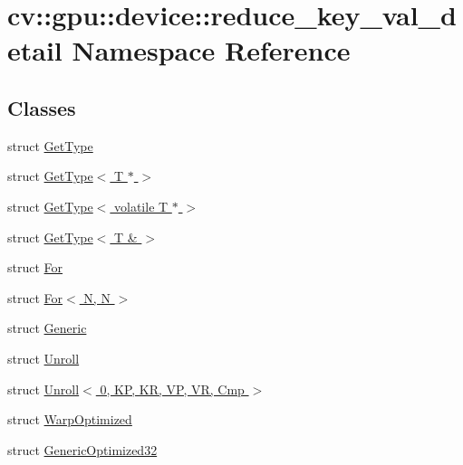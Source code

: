 \hypertarget{namespacecv_1_1gpu_1_1device_1_1reduce__key__val__detail}{\section{cv\-:\-:gpu\-:\-:device\-:\-:reduce\-\_\-key\-\_\-val\-\_\-detail Namespace Reference}
\label{namespacecv_1_1gpu_1_1device_1_1reduce__key__val__detail}
}
\subsection*{Classes}
\begin{DoxyCompactItemize}
\item 
struct \hyperlink{structcv_1_1gpu_1_1device_1_1reduce__key__val__detail_1_1GetType}{Get\-Type}
\item 
struct \hyperlink{structcv_1_1gpu_1_1device_1_1reduce__key__val__detail_1_1GetType_3_01T_01_5_01_4}{Get\-Type$<$ T $\ast$ $>$}
\item 
struct \hyperlink{structcv_1_1gpu_1_1device_1_1reduce__key__val__detail_1_1GetType_3_01volatile_01T_01_5_01_4}{Get\-Type$<$ volatile T $\ast$ $>$}
\item 
struct \hyperlink{structcv_1_1gpu_1_1device_1_1reduce__key__val__detail_1_1GetType_3_01T_01_6_01_4}{Get\-Type$<$ T \& $>$}
\item 
struct \hyperlink{structcv_1_1gpu_1_1device_1_1reduce__key__val__detail_1_1For}{For}
\item 
struct \hyperlink{structcv_1_1gpu_1_1device_1_1reduce__key__val__detail_1_1For_3_01N_00_01N_01_4}{For$<$ N, N $>$}
\item 
struct \hyperlink{structcv_1_1gpu_1_1device_1_1reduce__key__val__detail_1_1Generic}{Generic}
\item 
struct \hyperlink{structcv_1_1gpu_1_1device_1_1reduce__key__val__detail_1_1Unroll}{Unroll}
\item 
struct \hyperlink{structcv_1_1gpu_1_1device_1_1reduce__key__val__detail_1_1Unroll_3_010_00_01KP_00_01KR_00_01VP_00_01VR_00_01Cmp_01_4}{Unroll$<$ 0, K\-P, K\-R, V\-P, V\-R, Cmp $>$}
\item 
struct \hyperlink{structcv_1_1gpu_1_1device_1_1reduce__key__val__detail_1_1WarpOptimized}{Warp\-Optimized}
\item 
struct \hyperlink{structcv_1_1gpu_1_1device_1_1reduce__key__val__detail_1_1GenericOptimized32}{Generic\-Optimized32}
\item 

\end{DoxyCompactItemize}
